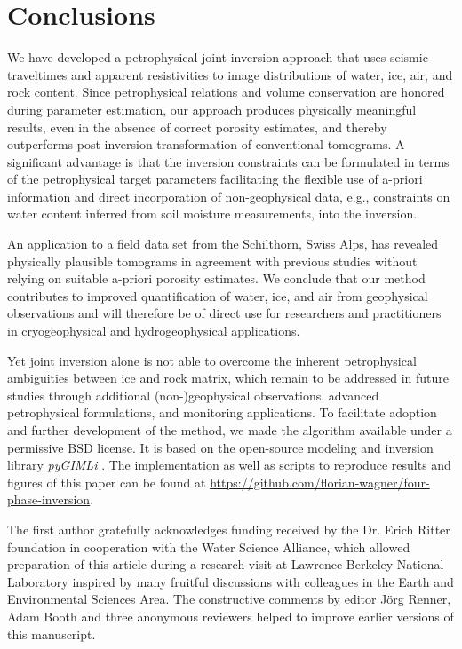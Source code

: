 \documentclass[extra]{gji}
\begin{document}
\section{Conclusions}
We have developed a petrophysical joint inversion approach that uses seismic traveltimes and apparent resistivities to image distributions of water, ice, air, and rock content.
Since petrophysical relations and volume conservation are honored during parameter estimation, our approach produces physically meaningful results, even in the absence of correct porosity estimates, and thereby outperforms post-inversion transformation of conventional tomograms.
A significant advantage is that the inversion constraints can be formulated in terms of the petrophysical target parameters facilitating the flexible use of a-priori information and direct incorporation of non-geophysical data, e.g., constraints on water content inferred from soil moisture measurements, into the inversion.

An application to a field data set from the Schilthorn, Swiss Alps, has revealed physically plausible tomograms in agreement with previous studies without relying on suitable a-priori porosity estimates.
We conclude that our method contributes to improved quantification of water, ice, and air from geophysical observations and will therefore be of direct use for researchers and practitioners in cryogeophysical and hydrogeophysical applications.

Yet joint inversion alone is not able to overcome the inherent petrophysical ambiguities between ice and rock matrix, which remain to be addressed in future studies through additional (non-)geophysical observations, advanced petrophysical formulations, and monitoring applications.
To facilitate adoption and further development of the method, we made the algorithm available under a permissive BSD license.
It is based on the open-source modeling and inversion library \textit{pyGIMLi} \citep{Ruecker2017}.
The implementation as well as scripts to reproduce results and figures of this paper can be found at \url{https://github.com/florian-wagner/four-phase-inversion}.

\begin{acknowledgments}
 The first author gratefully acknowledges funding received by the Dr. Erich Ritter foundation in cooperation with the Water Science Alliance, which allowed preparation of this article during a research visit at Lawrence Berkeley National Laboratory inspired by many fruitful discussions with colleagues in the Earth and Environmental Sciences Area.
 The constructive comments by editor J\"org Renner, Adam Booth and three anonymous reviewers helped to improve earlier versions of this manuscript.
\end{acknowledgments}
\end{document}

